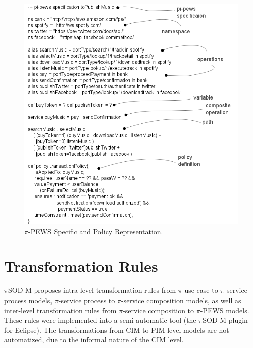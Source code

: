 \documentclass{singlecol-new}
\theoremstyle{TH}{
\newtheorem{lemma}{Lemma}
\newtheorem{theorem}[lemma]{Theorem}
\newtheorem{corrolary}[lemma]{Corrolary}
\newtheorem{conjecture}[lemma]{Conjecture}
\newtheorem{proposition}[lemma]{Proposition}
\newtheorem{claim}[lemma]{Claim}
\newtheorem{stheorem}[lemma]{Wrong Theorem}
\newtheorem{algorithm}{Algorithm}
}
\theoremstyle{THrm}{
\newtheorem{definition}{Definition}[section]
\newtheorem{question}{Question}[section]
\newtheorem{remark}{Remark}
\newtheorem{scheme}{Scheme}
}
\theoremstyle{THhit}{
\newtheorem{case}{Case}[section]
}
\theoremstyle{THhsl}{
\newtheorem{example}{Example}
}
\newcommand{\pisodm}[0]{$\pi$SOD-M\xspace}
\begin{document}
\begin{figure}[h]
\centering
\includegraphics[width=1\textwidth]{./figures/pi-pewsSpecification-toPublishMusic}
\caption{$\pi$-PEWS Specific and Policy Representation.}
\label{fig:Specific-Contract-Representation}
\end{figure}


\section{Transformation Rules}\label{sec:mmrules}



\pisodm  proposes intra-level transformation rules from $\pi$-use case to $\pi$-service process models, $\pi$-service process to $\pi$-service composition  models, as well as inter-level transformation rules from $\pi$-service composition to $\pi$-PEWS models. 
These rules were implemented into a semi-automatic tool (the \pisodm  plugin for Eclipse).
The transformations from CIM to PIM level models are not automatized, due to the informal nature of the CIM level.
 
\end{document}
